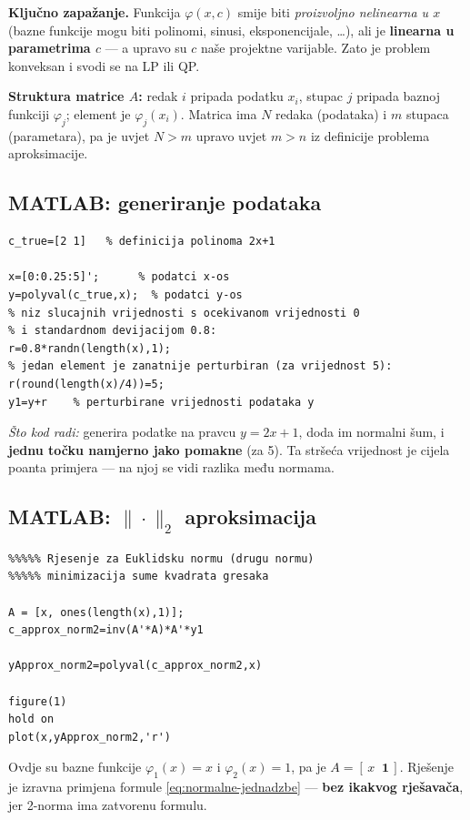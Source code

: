 \begin{zadatak}
\textbf{Ključno zapažanje.} Funkcija $\varphi(x,c)$ smije biti \emph{proizvoljno
nelinearna u $x$} (bazne funkcije mogu biti polinomi, sinusi, eksponencijale,
\dots), ali je \textbf{linearna u parametrima $c$} --- a upravo su $c$ naše
projektne varijable. Zato je problem konveksan i svodi se na LP ili QP.

\textbf{Struktura matrice $A$:} redak $i$ pripada podatku $x_i$, stupac $j$
pripada baznoj funkciji $\varphi_j$; element je $\varphi_j(x_i)$. Matrica ima
$N$ redaka (podataka) i $m$ stupaca (parametara), pa je uvjet $N > m$ upravo
uvjet $m > n$ iz definicije problema aproksimacije.
\end{zadatak}

\subsection{MATLAB: generiranje podataka}

\begin{verbatim}
c_true=[2 1]   % definicija polinoma 2x+1

x=[0:0.25:5]';      % podatci x-os
y=polyval(c_true,x);  % podatci y-os
% niz slucajnih vrijednosti s ocekivanom vrijednosti 0
% i standardnom devijacijom 0.8:
r=0.8*randn(length(x),1);
% jedan element je zanatnije perturbiran (za vrijednost 5):
r(round(length(x)/4))=5;
y1=y+r    % perturbirane vrijednosti podataka y
\end{verbatim}

\emph{Što kod radi:} generira podatke na pravcu $y = 2x + 1$, doda im normalni
šum, i \textbf{jednu točku namjerno jako pomakne} (za 5). Ta stršeća
vrijednost je cijela poanta primjera --- na njoj se vidi razlika među normama.

\subsection{MATLAB: $\|\cdot\|_2$ aproksimacija}

\begin{verbatim}
%%%%% Rjesenje za Euklidsku normu (drugu normu)
%%%%% minimizacija sume kvadrata gresaka

A = [x, ones(length(x),1)];
c_approx_norm2=inv(A'*A)*A'*y1

yApprox_norm2=polyval(c_approx_norm2,x)

figure(1)
hold on
plot(x,yApprox_norm2,'r')
\end{verbatim}

Ovdje su bazne funkcije $\varphi_1(x) = x$ i $\varphi_2(x) = 1$, pa je
$A = [\,x \;\; \mathbf{1}\,]$. Rješenje je izravna primjena formule
\eqref{eq:normalne-jednadzbe} --- \textbf{bez ikakvog rješavača}, jer 2-norma
ima zatvorenu formulu.


